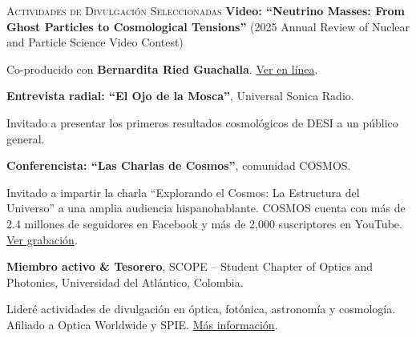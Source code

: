 \begin{rubric}{\faBullhorn \textsc{Actividades de Divulgación Seleccionadas}}
\entry*[]
\textbf{Video: ``Neutrino Masses: From Ghost Particles to Cosmological Tensions''} (2025 Annual Review of Nuclear and Particle Science Video Contest) \par
Co-producido con \textbf{Bernardita Ried Guachalla}. 
\href{https://www.youtube.com/watch?v=kna3FfmKTG8&t=18s}{Ver en línea}.

\entry*[]
\textbf{Entrevista radial: ``El Ojo de la Mosca''}, Universal Sonica Radio. \par
Invitado a presentar los primeros resultados cosmológicos de DESI a un público general.

\entry*[]
\textbf{Conferencista: ``Las Charlas de Cosmos''}, comunidad COSMOS. \par
Invitado a impartir la charla “Explorando el Cosmos: La Estructura del Universo” a una amplia audiencia hispanohablante. COSMOS cuenta con más de 2.4 millones de seguidores en Facebook y más de 2,000 suscriptores en YouTube. 
\href{https://www.youtube.com/watch?v=ui7ZfEto-Ws}{Ver grabación}.

\entry*[]
\textbf{Miembro activo \& Tesorero}, SCOPE – Student Chapter of Optics and Photonics, Universidad del Atlántico, Colombia. \par
Lideré actividades de divulgación en óptica, fotónica, astronomía y cosmología. Afiliado a Optica Worldwide y SPIE. 
\href{https://henoriega.github.io/outreach/outreach4/}{Más información}.

\end{rubric}
